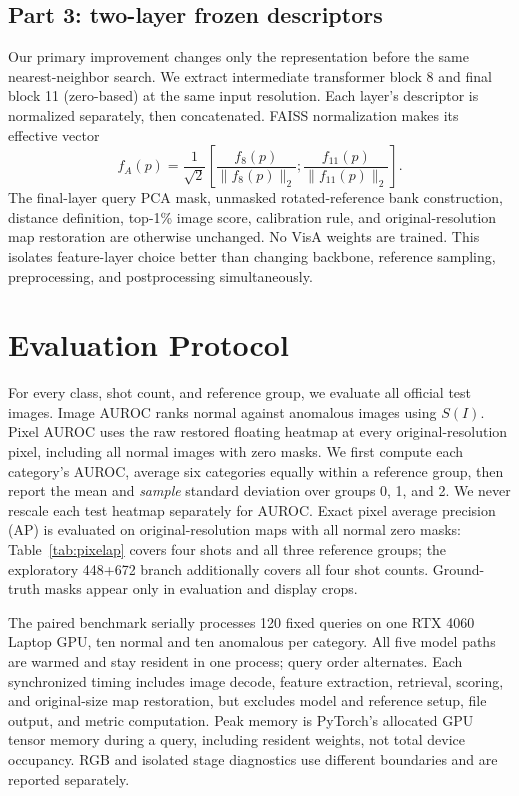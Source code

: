 \documentclass[times,10pt,twocolumn,letterpaper]{article}
\begin{document}
\subsection{Part 3: two-layer frozen descriptors}
Our primary improvement changes only the representation before the same nearest-neighbor search. We extract intermediate transformer block 8 and final block 11 (zero-based) at the same input resolution. Each layer's descriptor is normalized separately, then concatenated. FAISS normalization makes its effective vector
\begin{equation}
  f_A(p)=\frac{1}{\sqrt 2}\left[\frac{f_8(p)}{\lVert f_8(p)\rVert_2};
  \frac{f_{11}(p)}{\lVert f_{11}(p)\rVert_2}\right].
  \label{eq:two_layer}
\end{equation}
The final-layer query PCA mask, unmasked rotated-reference bank construction, distance definition, top-1\% image score, calibration rule, and original-resolution map restoration are otherwise unchanged. No VisA weights are trained. This isolates feature-layer choice better than changing backbone, reference sampling, preprocessing, and postprocessing simultaneously.

\section{Evaluation Protocol}
\label{sec:protocol}
For every class, shot count, and reference group, we evaluate all official test images. Image AUROC ranks normal against anomalous images using $S(I)$. Pixel AUROC uses the raw restored floating heatmap at every original-resolution pixel, including all normal images with zero masks. We first compute each category's AUROC, average six categories equally within a reference group, then report the mean and \emph{sample} standard deviation over groups 0, 1, and 2. We never rescale each test heatmap separately for AUROC. Exact pixel average precision (AP) is evaluated on original-resolution maps with all normal zero masks: Table~\ref{tab:pixelap} covers four shots and all three reference groups; the exploratory 448+672 branch additionally covers all four shot counts. Ground-truth masks appear only in evaluation and display crops.

The paired benchmark serially processes 120 fixed queries on one RTX 4060 Laptop GPU, ten normal and ten anomalous per category. All five model paths are warmed and stay resident in one process; query order alternates. Each synchronized timing includes image decode, feature extraction, retrieval, scoring, and original-size map restoration, but excludes model and reference setup, file output, and metric computation. Peak memory is PyTorch's allocated GPU tensor memory during a query, including resident weights, not total device occupancy. RGB and isolated stage diagnostics use different boundaries and are reported separately.
\end{document}
